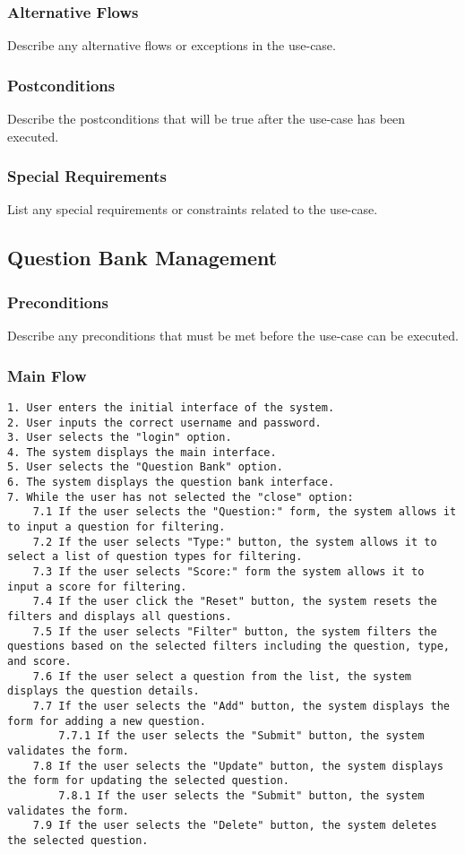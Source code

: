 \documentclass{article}
\begin{document}
\subsubsection{Alternative Flows}
Describe any alternative flows or exceptions in the use-case.

\subsubsection{Postconditions}
Describe the postconditions that will be true after the use-case has been executed.

\subsubsection{Special Requirements}
List any special requirements or constraints related to the use-case.

\subsection{Question Bank Management}
\subsubsection{Preconditions}
Describe any preconditions that must be met before the use-case can be executed.

\subsubsection{Main Flow}
\begin{verbatim}
1. User enters the initial interface of the system.
2. User inputs the correct username and password.
3. User selects the "login" option.
4. The system displays the main interface.
5. User selects the "Question Bank" option.
6. The system displays the question bank interface.
7. While the user has not selected the "close" option:
    7.1 If the user selects the "Question:" form, the system allows it to input a question for filtering.
    7.2 If the user selects "Type:" button, the system allows it to select a list of question types for filtering.
    7.3 If the user selects "Score:" form the system allows it to input a score for filtering.
    7.4 If the user click the "Reset" button, the system resets the filters and displays all questions.
    7.5 If the user selects "Filter" button, the system filters the questions based on the selected filters including the question, type, and score.
    7.6 If the user select a question from the list, the system displays the question details.
    7.7 If the user selects the "Add" button, the system displays the form for adding a new question.
        7.7.1 If the user selects the "Submit" button, the system validates the form.
    7.8 If the user selects the "Update" button, the system displays the form for updating the selected question.
        7.8.1 If the user selects the "Submit" button, the system validates the form.
    7.9 If the user selects the "Delete" button, the system deletes the selected question.
\end{verbatim}
\end{document}
